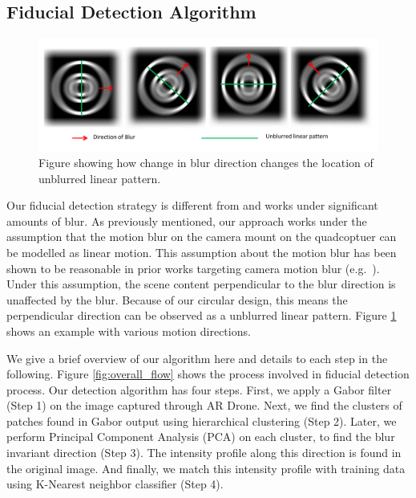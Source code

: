 \documentclass[runningheads]{llncs}
\begin{document}
\subsection{Fiducial Detection Algorithm}

\begin{figure}
\centering
\includegraphics[width=\linewidth]{blur_direction.pdf}
\caption{Figure showing how change in blur direction changes the location of
unblurred linear pattern.}
\label{fig:blur_direction}
\end{figure}

Our fiducial detection strategy is different from \cite{NaimarkF02,Pitag13} and works
under significant amounts of blur.   As previously mentioned, our approach works
 under the assumption that the motion blur on the camera mount on the quadcoptuer
 can be modelled as linear motion.  This assumption about the motion blur has been shown to be
 reasonable in prior works targeting camera motion blur (e.g.~\cite{Moshe:2003,Moshe:2004}).
Under this assumption, the scene content perpendicular to the blur direction is
unaffected by the blur.  Because of our circular design, this means the
perpendicular direction can be observed as a unblurred linear pattern.  Figure
\ref{fig:blur_direction} shows an example with various motion directions.

We give a brief overview of our algorithm here and details to each step in the
following. Figure \ref{fig:overall_flow} shows the process involved in fiducial
detection process. Our detection algorithm has four steps. First, we apply a
Gabor filter (Step 1) on the image captured through AR Drone. Next, we find the
clusters of patches found in Gabor output using hierarchical clustering (Step
2). Later, we perform Principal Component Analysis (PCA) on each cluster, to
find the blur invariant direction (Step 3). The intensity profile along this
direction is found in the original image. And finally, we match this intensity
profile with training data using K-Nearest neighbor classifier (Step 4). 
\end{document}
